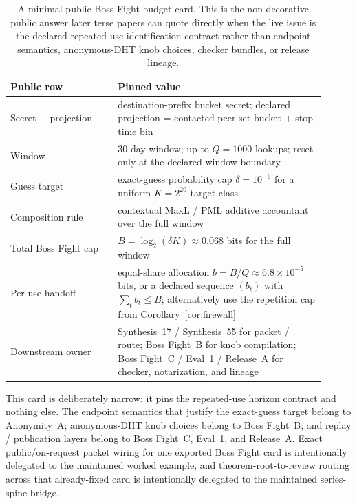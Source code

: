 \documentclass[11pt]{article}
\newcommand{\logtwo}{\log_2}
\begin{document}
\begin{table}[t]
\centering
\small
\begin{tabular}{@{}p{0.31\linewidth}p{0.60\linewidth}@{}}
\toprule
\textbf{Public row} & \textbf{Pinned value}\\
\midrule
Secret + projection & destination-prefix bucket secret; declared projection = contacted-peer-set bucket + stop-time bin \\
Window & 30-day window; up to $Q=1000$ lookups; reset only at the declared window boundary \\
Guess target & exact-guess probability cap $\delta=10^{-6}$ for a uniform $K=2^{20}$ target class \\
Composition rule & contextual MaxL / PML additive accountant over the full window \\
Total Boss Fight cap & $B=\logtwo(\delta K) \approx 0.068$ bits for the full window \\
Per-use handoff & equal-share allocation $b=B/Q \approx 6.8\times 10^{-5}$ bits, or a declared sequence $(b_t)$ with $\sum_t b_t\le B$; alternatively use the repetition cap from Corollary~\ref{cor:firewall} \\
Downstream owner & Synthesis~17 / Synthesis~55 for packet / route; Boss Fight~B for knob compilation; Boss Fight~C / Eval~1 / Release~A for checker, notarization, and lineage \\
\bottomrule
\end{tabular}
\caption{A minimal public Boss Fight budget card. This is the non-decorative public answer later terse papers can quote directly when the live issue is the declared repeated-use identification contract rather than endpoint semantics, anonymous-DHT knob choices, checker bundles, or release lineage.}
\label{tab:minimal-bossfight-card}
\end{table}

This card is deliberately narrow: it pins the repeated-use horizon contract and nothing else. The endpoint semantics that justify the exact-guess target belong to Anonymity~A; anonymous-DHT knob choices belong to Boss Fight~B; and replay / publication layers belong to Boss Fight~C, Eval~1, and Release~A. Exact public/on-request packet wiring for one exported Boss Fight card is intentionally delegated to the maintained worked example, and theorem-root-to-review routing across that already-fixed card is intentionally delegated to the maintained series-spine bridge.\cite{series:oddsinflation,series:bossfightB,series:bossfightC,series:workedexample,series:seriesspines,series:evalnotary,series:releaseproperty}
\end{document}
